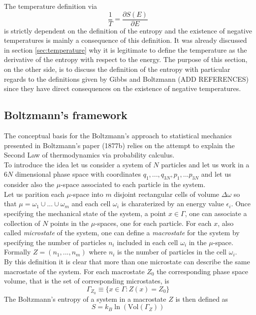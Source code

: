 The temperature definition via
\begin{equation*}
    \frac{1}{T} = \frac{\partial S(E)}{\partial E}
\end{equation*}
is strictly dependent on the definition of the entropy and the existence of negative temperatures is mainly a consequence of this definition. 
It was already discussed in section \ref{sec:temperature} why it is legitimate to define the temperature as the derivative of the entropy with respect to the energy. The purpose of this section, on the other side,
is to discuss the definition of the entropy with particular regards to the definitions given by Gibbs and Boltzmann (ADD REFERENCES) since they have direct consequences on the existence of negative temperatures. \\
\subsection*{Boltzmann's framework}
The conceptual basis for the Boltzmann's approach to statistical mechanics presented in Boltzmann's paper (1877b) relies on the attempt to explain the Second Law of thermodynamics via probability calculus. \\
To introduce the idea let us consider a system of $N$ particles and let us work in a $6N$ dimensional phase space with coordinates $q_1,...,q_{3N}, p_1, ... p_{3N}$ and let us consider also the $\mu$-space associated to each particle in the system. \\
Let us parition each $\mu$-space into $m$ disjoint rectangular cells of volume $\Delta\omega$ so that $\mu = \omega_1 \cup ... \cup \omega_m$ and each cell $\omega_i$ is charaterized by an energy value $\epsilon_i$. Once specifying the mechanical state of the system, a point $x \in \Gamma$, one can 
associate a collection of $N$ points in the $\mu$-spaces, one for each particle. For each $x$, also called \emph{microstate} of the system, one can define a \emph{macrostate} for the system by specifying the number of particles $n_i$ included in each cell $\omega_i$ in the $\mu$-space. 
Formally $Z = (n_1, ... , n_m)$ where $n_i$ is the number of particles in the cell $\omega_i$. \\
By this definition it is clear that more than one microstate can describe the same macrostate of the system. For each macrostate $Z_0$ the corresponding phase space volume, that is the set of corresponding microstates, is 
\begin{equation*}
    \Gamma_{Z_0} \equiv \{x \in \Gamma : Z(x) = Z_0\}
\end{equation*}
The Boltzmann's entropy of a system in a macrostate $Z$ is then defined as
\begin{equation*}
    S = k_B \ln\left( \text{Vol}(\Gamma_Z)\right)
\end{equation*}
